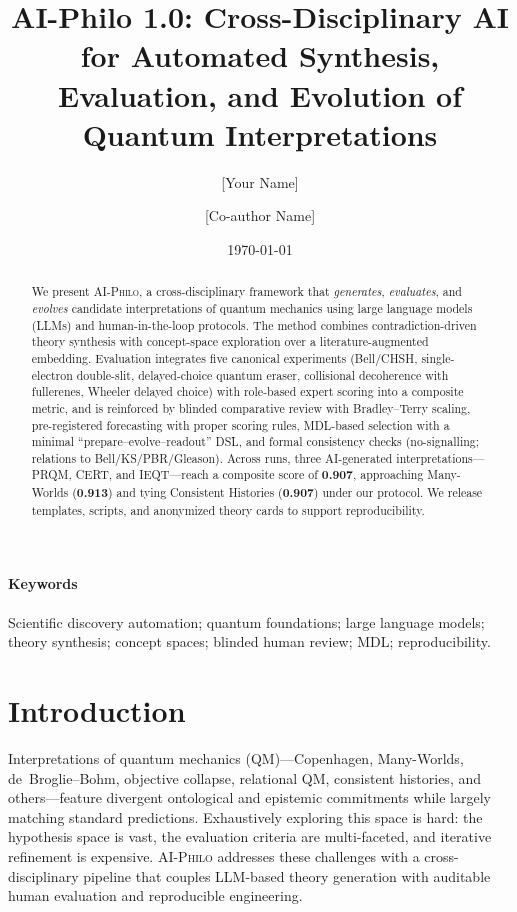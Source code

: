 \documentclass[11pt]{article}
\title{\textbf{AI-Philo 1.0: Cross-Disciplinary AI for Automated Synthesis, Evaluation, and Evolution of Quantum Interpretations}}
\author[1]{[Your Name]}
\author[1]{[Co-author Name]}
\affil[1]{[Affiliation], [City], [Country]}
\date{\today}
\begin{document}
\maketitle

\begin{abstract}
We present \textsc{AI-Philo}, a cross-disciplinary framework that \emph{generates}, \emph{evaluates}, and \emph{evolves} candidate interpretations of quantum mechanics using large language models (LLMs) and human-in-the-loop protocols. 
The method combines contradiction-driven theory synthesis with concept-space exploration over a literature-augmented embedding. 
Evaluation integrates five canonical experiments (Bell/CHSH, single-electron double-slit, delayed-choice quantum eraser, collisional decoherence with fullerenes, Wheeler delayed choice) with role-based expert scoring into a composite metric, and is reinforced by blinded comparative review with Bradley--Terry scaling, pre-registered forecasting with proper scoring rules, MDL-based selection with a minimal ``prepare--evolve--readout'' DSL, and formal consistency checks (no-signalling; relations to Bell/KS/PBR/Gleason). 
Across runs, three AI-generated interpretations---PRQM, CERT, and IEQT---reach a composite score of \textbf{0.907}, approaching Many-Worlds (\textbf{0.913}) and tying Consistent Histories (\textbf{0.907}) under our protocol. 
We release templates, scripts, and anonymized theory cards to support reproducibility.
\end{abstract}

\paragraph{Keywords} Scientific discovery automation; quantum foundations; large language models; theory synthesis; concept spaces; blinded human review; MDL; reproducibility.

\section{Introduction}
Interpretations of quantum mechanics (QM)---Copenhagen, Many-Worlds, de~Broglie--Bohm, objective collapse, relational QM, consistent histories, and others---feature divergent ontological and epistemic commitments while largely matching standard predictions.
Exhaustively exploring this space is hard: the hypothesis space is vast, the evaluation criteria are multi-faceted, and iterative refinement is expensive.
\textsc{AI-Philo} addresses these challenges with a cross-disciplinary pipeline that couples LLM-based theory generation with auditable human evaluation and reproducible engineering.
\end{document}
